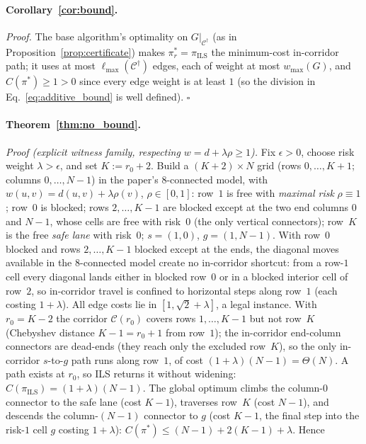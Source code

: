 \documentclass[11pt]{article}
\begin{document}
\paragraph{Corollary~\ref{cor:bound}.}
\noindent\textit{Proof.}
The base algorithm's optimality on $G|_{\mathcal{C}^{\dagger}}$ (as in Proposition~\ref{prop:certificate}) makes $\pi_r^* = \pi_{\mathrm{ILS}}$ the minimum-cost in-corridor path; it uses at most $\ell_{\max}(\mathcal{C}^{\dagger})$ edges, each of weight at most $w_{\max}(G)$, and $C(\pi^*) \geq 1 > 0$ since every edge weight is at least $1$ (so the division in Eq.~\eqref{eq:additive_bound} is well defined). $\square$

\paragraph{Theorem~\ref{thm:no_bound}.}
\noindent\textit{Proof (explicit witness family, respecting $w = d + \lambda\rho \geq 1$).}
Fix $\epsilon > 0$, choose risk weight $\lambda > \epsilon$, and set $K := r_0 + 2$. Build a $(K{+}2)\times N$ grid (rows $0,\dots,K{+}1$; columns $0,\dots,N{-}1$) in the paper's $8$-connected model, with $w(u,v) = d(u,v) + \lambda\rho(v)$, $\rho \in [0,1]$: row~$1$ is free with \emph{maximal risk} $\rho \equiv 1$; row~$0$ is blocked; rows $2,\dots,K{-}1$ are blocked except at the two end columns $0$ and $N{-}1$, whose cells are free with risk~$0$ (the only vertical connectors); row~$K$ is the free \emph{safe lane} with risk~$0$; $s = (1,0)$, $g = (1,N{-}1)$. With row~$0$ blocked and rows $2,\dots,K{-}1$ blocked except at the ends, the diagonal moves available in the $8$-connected model create no in-corridor shortcut: from a row-$1$ cell every diagonal lands either in blocked row~$0$ or in a blocked interior cell of row~$2$, so in-corridor travel is confined to horizontal steps along row~$1$ (each costing $1+\lambda$). All edge costs lie in $[1, \sqrt2 + \lambda]$, a legal instance. With $r_0 = K{-}2$ the corridor $\mathcal{C}(r_0)$ covers rows $1,\dots,K{-}1$ but not row~$K$ (Chebyshev distance $K{-}1 = r_0{+}1$ from row~$1$); the in-corridor end-column connectors are dead-ends (they reach only the excluded row~$K$), so the only in-corridor $s$-to-$g$ path runs along row~$1$, of cost $(1+\lambda)(N{-}1) = \Theta(N)$. A path exists at $r_0$, so ILS returns it without widening: $C(\pi_{\mathrm{ILS}}) = (1+\lambda)(N{-}1)$. The global optimum climbs the column-$0$ connector to the safe lane (cost $K{-}1$), traverses row~$K$ (cost $N{-}1$), and descends the column-$(N{-}1)$ connector to $g$ (cost $K{-}1$, the final step into the risk-$1$ cell $g$ costing $1+\lambda$): $C(\pi^*) \leq (N{-}1) + 2(K{-}1) + \lambda$. Hence
\end{document}
